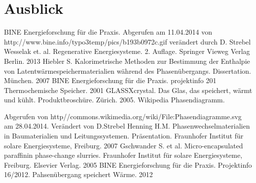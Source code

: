 \documentclass[11pt,a4paper]{scrartcl}
\begin{document}
\section{Ausblick}
\newpage
\listoftables
\newpage
\listoffigures
\newpage
\begin{thebibliography}{99}
	BINE Energieforschung für die Praxis. Abgerufen am 11.04.2014
	von http://www.bine.info/typo3temp/pics/b193b0972c.gif verändert durch D. Strebel
	Wesselak et. al. Regenerative Energiesysteme. 2. Auflage.
	Springer Vieweg Verlag Berlin. 2013
	 Hiebler S. Kalorimetrische Methoden zur Bestimmung der
	Enthalpie von Latentwärmespeichermaterialien während des Phasenübergangs. Dissertation.
	München. 2007
	 BINE Energieforschung für die Praxis. projektinfo 2\/01
	Thermochemische Speicher. 2001
	 GLASSX\circledR crystal. Das Glas, das speichert, wärmt und
	kühlt. Produktbroschüre. Zürich. 2005. 
	 Wikipedia Phasendiagramm. 
	
	Abgerufen von
	http//commons.wikimedia.org/wiki/File:Phasendiagramme.svg am 28.04.2014.
	Verändert von D.Strebel
	 Henning H.M. Phasenwechselmaterialien in Baumaterialien und
	Leitungssystemen. Präsentation. Fraunhofer Institut für solare Energiesysteme,
	Freiburg. 2007
	 Gschwander S. et al. Micro-encapsulated paraffinin
	phase-change slurries. Fraunhofer Institut für solare Energiesysteme,
	Freiburg. Elsevier Verlag. 2005
	 BINE Energieforschung für die Praxis. Projektinfo 16/2012.
	Pahsenübergang speichert Wärme. 2012
\end{thebibliography}
\end{document}
